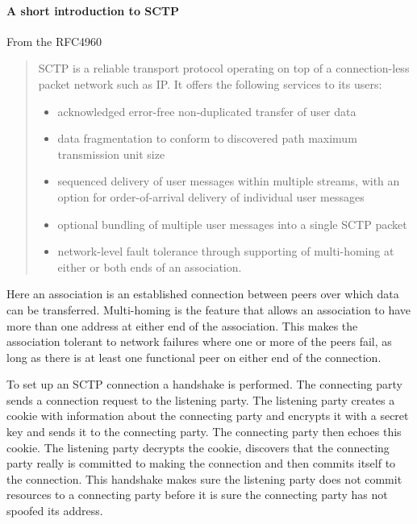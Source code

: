 \paragraph{A short introduction to SCTP}
From the RFC4960\cite{_rfc_????}
\begin{quotation}
SCTP is a reliable transport protocol operating on top of a
   connection-less packet network such as IP.  It offers the following
   services to its users:
\begin{itemize}

   \item acknowledged error-free non-duplicated transfer of user data

   \item data fragmentation to conform to discovered path maximum transmission unit size

   \item sequenced delivery of user messages within multiple streams, with
       an option for order-of-arrival delivery of individual user
       messages

   \item optional bundling of multiple user messages into a single SCTP
       packet

   \item network-level fault tolerance through supporting of multi-homing
       at either or both ends of an association.
\end{itemize}
\end{quotation}
Here an association is an established connection between peers over which data can be transferred. Multi-homing is the feature that allows an association to have more than one address at either end of the association. This makes the association tolerant to network failures where one or more of the peers fail, as long as there is at least one functional peer on either end of the connection.

To set up an SCTP connection a handshake is performed. The connecting party sends a connection request to the listening party. The listening party creates a cookie with information about the connecting party and encrypts it with a secret key and sends it to the connecting party. The connecting party then echoes this cookie. The listening party decrypts the cookie, discovers that the connecting party really is committed to making the connection and then commits itself to the connection. This handshake makes sure the listening party does not commit resources to a connecting party before it is sure the connecting party has not spoofed its address.

